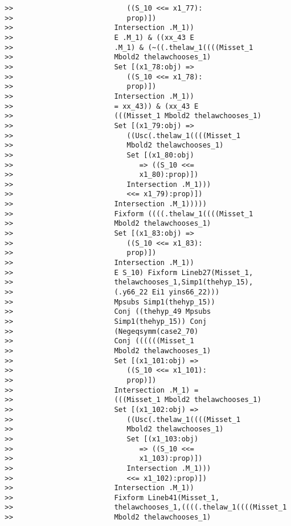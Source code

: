 \documentclass[12pt]{article}
\begin{document}
\begin{verbatim}
>>                           ((S_10 <<= x1_77):
>>                           prop)])
>>                        Intersection .M_1))
>>                        E .M_1) & ((xx_43 E
>>                        .M_1) & (~((.thelaw_1((((Misset_1
>>                        Mbold2 thelawchooses_1)
>>                        Set [(x1_78:obj) =>
>>                           ((S_10 <<= x1_78):
>>                           prop)])
>>                        Intersection .M_1))
>>                        = xx_43)) & (xx_43 E
>>                        (((Misset_1 Mbold2 thelawchooses_1)
>>                        Set [(x1_79:obj) =>
>>                           ((Usc(.thelaw_1((((Misset_1
>>                           Mbold2 thelawchooses_1)
>>                           Set [(x1_80:obj)
>>                              => ((S_10 <<=
>>                              x1_80):prop)])
>>                           Intersection .M_1)))
>>                           <<= x1_79):prop)])
>>                        Intersection .M_1)))))
>>                        Fixform ((((.thelaw_1((((Misset_1
>>                        Mbold2 thelawchooses_1)
>>                        Set [(x1_83:obj) =>
>>                           ((S_10 <<= x1_83):
>>                           prop)])
>>                        Intersection .M_1))
>>                        E S_10) Fixform Lineb27(Misset_1,
>>                        thelawchooses_1,Simp1(thehyp_15),
>>                        (.y66_22 Ei1 yins66_22)))
>>                        Mpsubs Simp1(thehyp_15))
>>                        Conj ((thehyp_49 Mpsubs
>>                        Simp1(thehyp_15)) Conj
>>                        (Negeqsymm(case2_70)
>>                        Conj ((((((Misset_1
>>                        Mbold2 thelawchooses_1)
>>                        Set [(x1_101:obj) =>
>>                           ((S_10 <<= x1_101):
>>                           prop)])
>>                        Intersection .M_1) =
>>                        (((Misset_1 Mbold2 thelawchooses_1)
>>                        Set [(x1_102:obj) =>
>>                           ((Usc(.thelaw_1((((Misset_1
>>                           Mbold2 thelawchooses_1)
>>                           Set [(x1_103:obj)
>>                              => ((S_10 <<=
>>                              x1_103):prop)])
>>                           Intersection .M_1)))
>>                           <<= x1_102):prop)])
>>                        Intersection .M_1))
>>                        Fixform Lineb41(Misset_1,
>>                        thelawchooses_1,((((.thelaw_1((((Misset_1
>>                        Mbold2 thelawchooses_1)

\end{verbatim}
\end{document}
